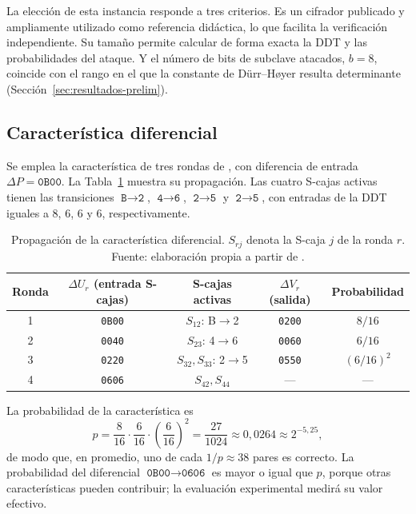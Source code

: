 La elección de esta instancia responde a tres criterios. Es un cifrador publicado y ampliamente utilizado como referencia didáctica, lo que facilita la verificación independiente. Su tamaño permite calcular de forma exacta la DDT y las probabilidades del ataque. Y el número de bits de subclave atacados, \(b=8\), coincide con el rango en el que la constante de Dürr--Høyer resulta determinante (Sección~\ref{sec:resultados-prelim}).

\subsection{Característica diferencial}

Se emplea la característica de tres rondas de \citet{heys2002}, con diferencia de entrada \(\Delta P=\texttt{0B00}\). La Tabla~\ref{tab:caracteristica} muestra su propagación. Las cuatro S-cajas activas tienen las transiciones \(\texttt{B}\to\texttt{2}\), \(\texttt{4}\to\texttt{6}\), \(\texttt{2}\to\texttt{5}\) y \(\texttt{2}\to\texttt{5}\), con entradas de la DDT iguales a 8, 6, 6 y 6, respectivamente.

\begin{table}[H]
\centering
\begin{tabular}{c c c c c}
\hline\hline
Ronda & \(\Delta U_r\) (entrada S-cajas) & S-cajas activas & \(\Delta V_r\) (salida) & Probabilidad \\
\hline
1 & \texttt{0B00} & \(S_{12}\): B\(\to\)2 & \texttt{0200} & \(8/16\) \\
2 & \texttt{0040} & \(S_{23}\): 4\(\to\)6 & \texttt{0060} & \(6/16\) \\
3 & \texttt{0220} & \(S_{32}, S_{33}\): 2\(\to\)5 & \texttt{0550} & \((6/16)^2\) \\
4 & \texttt{0606} & \(S_{42}, S_{44}\) & --- & --- \\
\hline
\end{tabular}
\caption[Característica diferencial de tres rondas]{Propagación de la característica diferencial. \(S_{rj}\) denota la S-caja \(j\) de la ronda \(r\). Fuente: elaboración propia a partir de \cite{heys2002}.}
\label{tab:caracteristica}
\end{table}

La probabilidad de la característica es
\begin{equation}
 p=\frac{8}{16}\cdot\frac{6}{16}\cdot\left(\frac{6}{16}\right)^2=\frac{27}{1024}\approx 0{,}0264\approx 2^{-5{,}25},
 \label{eq:p}
\end{equation}
de modo que, en promedio, uno de cada \(1/p\approx 38\) pares es correcto. La probabilidad del diferencial \(\texttt{0B00}\to\texttt{0606}\) es mayor o igual que \(p\), porque otras características pueden contribuir; la evaluación experimental medirá su valor efectivo.

